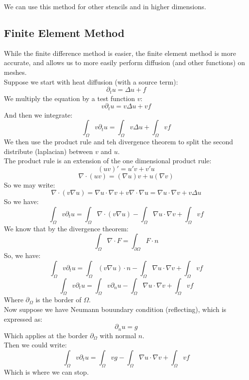\documentclass[12pt]{article}
\begin{document}
We can use this method for other stencils and in higher
dimensions. \\

\newpage

\subsection*{Finite Element Method}

While the finite difference method is easier, the finite
element method is more accurate, and allows us to more
easily perform diffusion (and other functions) on meshes. \\

Suppose we start with heat diffusion (with a source term):
\[ \partial_t u = \Delta u + f \]
We multiply the equation by a test function $v$:
\[ v \partial_t u = v\Delta u + vf \]
And then we integrate:
\[ \int_\Omega v \partial_t u = 
\int_\Omega v\Delta u +  \int_\Omega vf \]
We then use the product rule and teh divergence
theorem to split the second distribute (laplacian)
between $v$ and $u$. \\
The product rule is an extension of the one dimensional
product rule:
\[ (uv)' = u'v + v'u \]
\[ \nabla \cdot (uv) = (\nabla u) v + u (\nabla v) \]
So we may write:
\[ \nabla \cdot (v \nabla u) = \nabla u \cdot \nabla v + 
v \nabla \cdot \nabla u = 
\nabla u \cdot \nabla v + v \Delta u \]
So we have:
\[ \int_\Omega v \partial_t u = 
\int_\Omega \nabla \cdot (v \nabla u)
- \int_\Omega \nabla u \cdot \nabla v + \int_\Omega vf \]
We know that by the divergence theorem:
\[ \int_\Omega \nabla \cdot F = 
\int_{\partial \Omega} F \cdot n \]
So, we have:
\[ \int_\Omega v \partial_t u = 
\int_\Omega (v \nabla u) \cdot n
- \int_\Omega \nabla u \cdot \nabla v + \int_\Omega vf \]
\[ \int_\Omega v \partial_t u = 
\int_\Omega v \partial_n u
- \int_\Omega \nabla u \cdot \nabla v + \int_\Omega vf \]
Where $\partial_\Omega$ is the border of $\Omega$. \\

Now suppose we have Neumann bouundary condition (reflecting),
which is expressed as:
\[ \partial_n u = g \]
Which applies at the border $\partial_\Omega$
with normal $n$. \\
Then we could write:
\[ \int_\Omega v \partial_t u = 
\int_\Omega vg
- \int_\Omega \nabla u \cdot \nabla v + \int_\Omega vf \]
Which is where we can stop. \\
\end{document}
